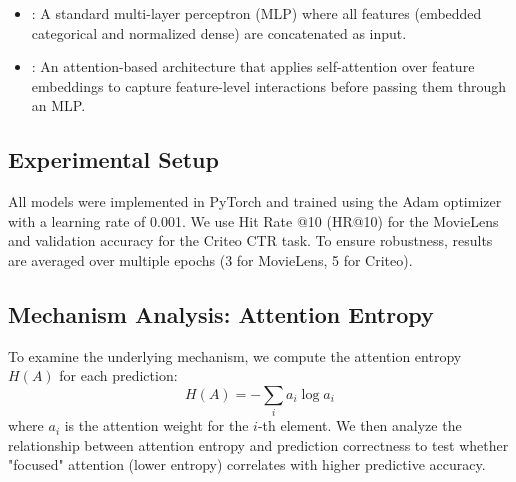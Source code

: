 \begin{itemize}[leftmargin=*,itemsep=0pt,topsep=0pt]
    \item \mlp: A standard multi-layer perceptron (MLP) where all features (embedded categorical and normalized dense) are concatenated as input.
    \item \attentionmlp: An attention-based architecture that applies self-attention over feature embeddings to capture feature-level interactions before passing them through an MLP.
\end{itemize}

\subsection{Experimental Setup}
All models were implemented in PyTorch and trained using the Adam optimizer with a learning rate of 0.001. We use Hit Rate @10 (HR@10) for the MovieLens \sectask and validation accuracy for the Criteo CTR task. To ensure robustness, results are averaged over multiple epochs (3 for MovieLens, 5 for Criteo).

\subsection{Mechanism Analysis: Attention Entropy}
To examine the underlying mechanism, we compute the attention entropy $H(A)$ for each prediction:
\begin{equation}
    H(A) = - \sum_{i} a_i \log a_i
\end{equation}
where $a_i$ is the attention weight for the $i$-th element. We then analyze the relationship between attention entropy and prediction correctness to test whether "focused" attention (lower entropy) correlates with higher predictive accuracy.
